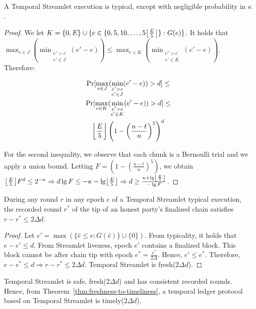 \begin{lemma} \label{lem:honest-quintuple}
  A Temporal Streamlet execution is typical, except with negligible probability in $\kappa$.
\end{lemma}
\begin{proof}
  We let $K = \{0, E\} \cup \{e \in \{0, 5, 10 ,\ldots, 5\floor*{\frac{E}{5}}\}: G(e)\}$.
  It holds that
  $\max_{e \in J}(\min_{\substack{e' > e \\ e' \in J}}(e' - e)) \leq \max_{e \in K}(\min_{\substack{e' > e \\ e' \in K}}(e' - e))$.
  Therefore:

  \begin{gather*}
      \Pr [\max_{e \in J}(\min_{\substack{e' > e \\ e' \in J}}(e' - e)) > d] \leq \\
      \Pr [\max_{e \in K}(\min_{\substack{e' > e \\ e' \in K}}(e' - e)) > d] \leq \\
      \floor*{\frac{E}{5}} \left(1 - \left(\frac{n - t}{n}\right)^5\right)^d
  \end{gather*}

  For the second inequality, we observe that each chunk is a Bernoulli trial and we
  apply a union bound.
  Letting $F = \left(1 - \left(\frac{n - t}{n}\right)^5\right)$, we obtain
  $\floor*{\frac{E}{5}} F^d \leq 2^{-\kappa} \Rightarrow
   d \lg F \leq -\kappa - \lg \floor*{\frac{E}{5}} \Rightarrow
   d \geq \frac{\kappa + \lg \floor*{\frac{E}{5}}}{- \lg F}
  $.
  \Qed
\end{proof}

\begin{lemma} \label{lem:latest-finalized-round}
  During any round $r$ in any epoch $e$ of a Temporal Streamlet typical execution,
  the recorded round $r^*$ of the tip of an honest party's finalized chain
  satisfies $r - r^* \leq 2\Delta d$.
\end{lemma}
\begin{proof}
  Let $e' = \max(\{\hat e \leq e: G(\hat e)\} \cup \{0\})$.
  From typicality, it holds that $e - e' \leq d$.
  From Streamlet liveness, epoch $e'$ contains a finalized
  block. This block cannot be after chain tip with epoch $e^* = \frac{r^*}{2\Delta}$.
  Hence, $e' \leq e^*$. Therefore, $e - e^* \leq d \Rightarrow r - r^* \leq 2\Delta d$.
  Temporal Streamlet is fresh($2\Delta d$).
  \Qed
\end{proof}

Temporal Streamlet is safe, fresh($2\Delta d$) and has consistent recorded rounds.
Hence, from Theorem~\ref{thm:freshness-to-timeliness}, a temporal ledger protocol
based on Temporal Streamlet is timely($2\Delta d$).
